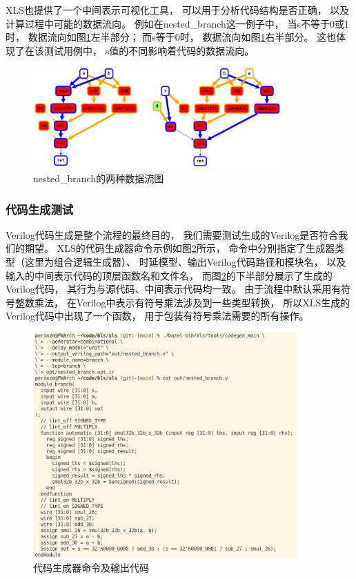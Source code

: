 XLS也提供了一个中间表示可视化工具，
可以用于分析代码结构是否正确，
以及计算过程中可能的数据流向。
例如在nested\_branch这一例子中，
当s不等于0或1时，
数据流向如图\ref{fig.8}左半部分；
而s等于0时，
数据流向如图\ref{fig.8}右半部分。
这也体现了在该测试用例中，
s值的不同影响着代码的数据流向。

\begin{figure}[h]
\centering
\includegraphics[width=0.85\textwidth]{figure/ir_viz.png}
\caption{nested\_branch的两种数据流图}
\label{fig.8}
\end{figure}

\pagebreak

\subsubsection{代码生成测试}

Verilog代码生成是整个流程的最终目的，
我们需要测试生成的Verilog是否符合我们的期望。
XLS的代码生成器命令示例如图\ref{fig.11}所示，
命令中分别指定了生成器类型（这里为组合逻辑生成器）、
时延模型、输出Verilog代码路径和模块名，
以及输入的中间表示代码的顶层函数名和文件名，
而图\ref{fig.11}的下半部分展示了生成的Verilog代码，
其行为与源代码、中间表示代码均一致。
由于流程中默认采用有符号整数乘法，
在Verilog中表示有符号乘法涉及到一些类型转换，
所以XLS生成的Verilog代码中出现了一个函数，
用于包装有符号乘法需要的所有操作。

\begin{figure}[h]
\centering
\includegraphics[width=0.9\textwidth]{figure/codegen_command.png}
\caption{代码生成器命令及输出代码}
\label{fig.11}
\end{figure}

